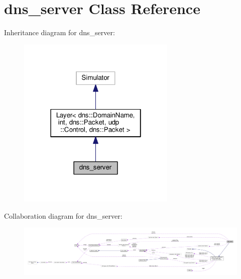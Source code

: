\hypertarget{classdns__server}{}\section{dns\+\_\+server Class Reference}
\label{classdns__server}


Inheritance diagram for dns\+\_\+server\+:\nopagebreak
\begin{figure}[H]
\begin{center}
\leavevmode
\includegraphics[width=214pt]{classdns__server__inherit__graph}
\end{center}
\end{figure}


Collaboration diagram for dns\+\_\+server\+:\nopagebreak
\begin{figure}[H]
\begin{center}
\leavevmode
\includegraphics[width=350pt]{classdns__server__coll__graph}
\end{center}
\end{figure}
